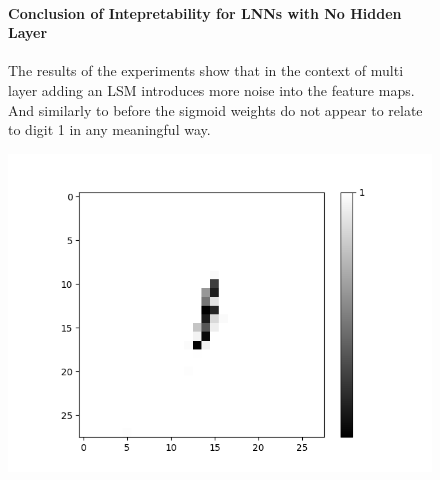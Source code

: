 \begin{figure}[H]
	\begin{minipage}[t]{0.48\textwidth}
		\vspace{0px}
		\paragraph{Conclusion of Intepretability for LNNs with No Hidden Layer}
The results of the experiments show that in the context of multi layer adding an LSM introduces more noise into the feature maps. And similarly to before the sigmoid weights do not appear to relate to digit 1 in any meaningful way.
	\end{minipage}
\hspace{2px}
	\begin{minipage}[t]{0.5\textwidth}
\vspace{0px}
	\centering
	\begin{minipage}[b]{0.5\textwidth}
		\captionsetup{labelformat=empty}
		\includegraphics[width=\textwidth]{AND-OR(W-LSM)(1)/Like/True/Layer0-Neuron-9.png}
		\label{}
	\end{minipage}
	
	\medskip
	

\end{minipage}
\end{figure}
